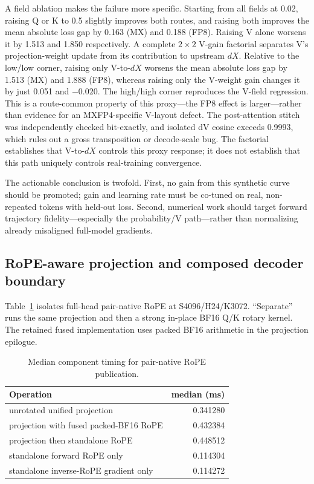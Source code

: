 A field ablation makes the failure more specific.  Starting from all fields
at 0.02, raising Q or K to 0.5 slightly improves both routes, and raising both
improves the mean absolute loss gap by 0.163 (MX) and 0.188 (FP8).  Raising V
alone worsens it by 1.513 and 1.850 respectively.  A complete $2\times2$
V-gain factorial separates V's projection-weight update from its contribution
to upstream $dX$.  Relative to the low/low corner, raising only V-to-$dX$
worsens the mean absolute loss gap by 1.513 (MX) and 1.888 (FP8), whereas
raising only the V-weight gain changes it by just 0.051 and $-0.020$.
The high/high corner reproduces the V-field regression.  This is a
route-common property of this proxy---the FP8 effect is larger---rather than
evidence for an MXFP4-specific V-layout defect.  The post-attention stitch was
independently checked bit-exactly, and isolated dV cosine exceeds 0.9993, which
rules out a gross transposition or decode-scale bug.  The factorial establishes
that V-to-$dX$ controls this proxy response; it does not establish that this
path uniquely controls real-training convergence.

The actionable conclusion is twofold.  First, no gain from this synthetic
curve should be promoted; gain and learning rate must be co-tuned on real,
non-repeated tokens with held-out loss.  Second, numerical work should target
forward trajectory fidelity---especially the probability/V path---rather than
normalizing already misaligned full-model gradients.

\subsection{RoPE-aware projection and composed decoder boundary}

Table~\ref{tab:rope-projection-components} isolates full-head pair-native
RoPE at S4096/H24/K3072.  ``Separate'' runs the same projection and then a
strong in-place BF16 Q/K rotary kernel.  The retained fused implementation
uses packed BF16 arithmetic in the projection epilogue.

\begin{table}[htbp]
\centering
\caption{Median component timing for pair-native RoPE publication.}
\label{tab:rope-projection-components}
\small
\begin{tabular}{l r}
\toprule
Operation & median (ms) \\
\midrule
unrotated unified projection & 0.341280 \\
projection with fused packed-BF16 RoPE & 0.432384 \\
projection then standalone RoPE & 0.448512 \\
standalone forward RoPE only & 0.114304 \\
standalone inverse-RoPE gradient only & 0.114272 \\
\bottomrule
\end{tabular}
\end{table}

